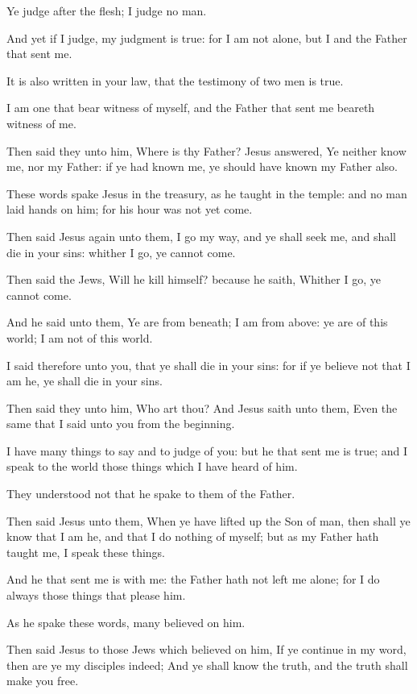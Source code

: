 \Verse Ye judge after the flesh; I judge no man.

\Verse And yet if I judge, my judgment is true: for I am not alone, but I and the Father that sent me.

\Verse It is also written in your law, that the testimony of two men is true.

\Verse I am one that bear witness of myself, and the Father that sent me beareth witness of me.

\Verse Then said they unto him, Where is thy Father? Jesus answered, Ye neither know me, nor my Father: if ye had known me, ye should have known my Father also.

\Verse These words spake Jesus in the treasury, as he taught in the temple: and no man laid hands on him; for his hour was not yet come.

\Verse Then said Jesus again unto them, I go my way, and ye shall seek me, and shall die in your sins: whither I go, ye cannot come.

\Verse Then said the Jews, Will he kill himself? because he saith, Whither I go, ye cannot come.

\Verse And he said unto them, Ye are from beneath; I am from above: ye are of this world; I am not of this world.

\Verse I said therefore unto you, that ye shall die in your sins: for if ye believe not that I am he, ye shall die in your sins.

\Verse Then said they unto him, Who art thou? And Jesus saith unto them, Even the same that I said unto you from the beginning.

\Verse I have many things to say and to judge of you: but he that sent me is true; and I speak to the world those things which I have heard of him.

\Verse They understood not that he spake to them of the Father.

\Verse Then said Jesus unto them, When ye have lifted up the Son of man, then shall ye know that I am he, and that I do nothing of myself; but as my Father hath taught me, I speak these things.

\Verse And he that sent me is with me: the Father hath not left me alone; for I do always those things that please him.

\Verse As he spake these words, many believed on him.

\Verse Then said Jesus to those Jews which believed on him, If ye continue in my word, then are ye my disciples indeed; \Verse And ye shall know the truth, and the truth shall make you free.

